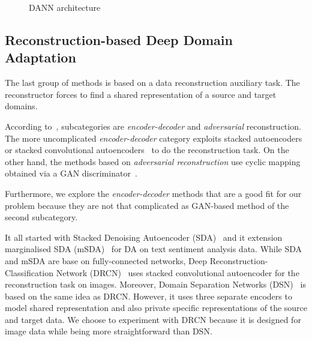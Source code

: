 \begin{figure}
\begin{center}
\end{center}
\caption{DANN architecture}
\end{figure}

\subsection{Reconstruction-based Deep Domain Adaptation}
\label{reconstruction_da}

The last group of methods is based on a data reconstruction auxiliary task.
The reconstructor forces to find a shared representation of a source and target domains.

According to~\cite{wang2018}, subcategories are \textit{encoder-decoder} and
\textit{adversarial} reconstruction.
The more uncomplicated \textit{encoder-decoder} category exploits stacked autoencoders~\cite{vincent2008} or stacked convolutional autoencoders~\cite{masci2011}
to do the reconstruction task.
On the other hand, the methods based on \textit{adversarial reconstruction} use cyclic mapping obtained via a GAN discriminator~\cite{goodfellow2014}.

Furthermore, we explore the \textit{encoder-decoder} methods that are a good fit for our problem
because they are not that complicated as GAN-based method of the second subcategory.

It all started with Stacked Denoising Autoencoder (SDA)~\cite{glorot2011}
and it extension marginalised SDA (mSDA)~\cite{chen2012} for DA on text sentiment analysis data.
While SDA and mSDA are base on fully-connected networks,
Deep Reconstruction-Classification Network (DRCN)~\cite{ghifary2016}
uses stacked convolutional autoencoder for the reconstruction task on images.
Moreover, Domain Separation Networks (DSN)~\cite{bousmalis2016} is based on the same idea as DRCN.
However, it uses three separate encoders to model shared representation
and also private specific representations of the source and target data.
We choose to experiment with DRCN
because it is designed for image data while being more straightforward than DSN.

